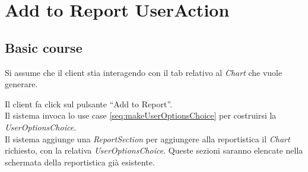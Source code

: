 \section{Add to Report UserAction}
\label{seq:addToReportUserAction}
\subsection{Basic course}
Si assume che il client stia interagendo con il tab relativo al \emph{Chart}
che vuole generare.

Il client fa click sul pulsante ``Add to Report''.\\
Il sistema invoca lo use case \ref{seq:makeUserOptionsChoice} per costruirsi la
\emph{UserOptionsChoice}. \\
Il sistema aggiunge una \emph{ReportSection} per aggiungere alla reportistica
il \emph{Chart} richiesto, con la relativa \emph{UserOptionsChoice}. Queste
sezioni saranno elencate nella schermata della reportistica gi\`a esistente.